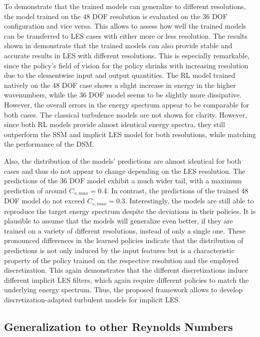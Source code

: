 To demonstrate that the trained models can generalize to different resolutions, the model trained on the 48 DOF resolution is evaluated on the 36 DOF configuration and vice versa.
This allows to assess how well the trained models can be transferred to LES cases with either more or less resolution.
The results shown in  demonstrate that the trained models can also provide stable and accurate results in LES with different resolutions.
This is especially remarkable, since the policy's field of vision for the policy shrinks with increasing resolution due to the elementwise input and output quantities.
The RL model trained natively on the 48 DOF case shows a slight increase in energy in the higher wavenumbers, while the 36 DOF model seems to be slightly more dissipative.
However, the overall errors in the energy spectrum appear to be comparable for both cases.
The classical turbulence models are not shown for clarity.
However, since both RL models provide almost identical energy spectra, they still outperform the SSM and implicit LES model for both resolutions, while matching the performance of the DSM.

Also, the distribution of the models' predictions are almost identical for both cases and thus do not appear to change depending on the LES resolution.
The predictions of the 36 DOF model exhibit a much wider tail, with a maximum prediction of around $C_{s,max}=0.4$.
In contrast, the predictions of the trained 48 DOF model do not exceed $C_{s,max}=0.3$.
Interestingly, the models are still able to reproduce the target energy spectrum despite the deviations in their policies.
It is plausible to assume that the models will generalize even better, if they are trained on a variety of different resolutions, instead of only a single one.
These pronounced differences in the learned policies indicate that the distribution of predictions is not only induced by the input features but is a characteristic property of the policy trained on the respective resolution and the employed discretization.
This again demonstrates that the different discretizations induce different implicit LES filters, which again require different policies to match the underlying energy spectrum.
Thus, the proposed framework allows to develop discretization-adapted turbulent models for implicit LES.

\subsection{Generalization to other Reynolds Numbers}
\label{sec:results_generalize_re}

